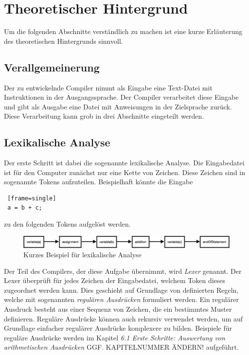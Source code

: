 
\section{Theoretischer Hintergrund}
Um die folgenden Abschnitte verständlich zu machen ist eine kurze Erläuterung des theoretischen Hintergrunds sinnvoll.
\subsection{Verallgemeinerung}
Der zu entwickelnde Compiler nimmt als Eingabe eine Text-Datei mit Instruktionen in der Ausgangssprache. Der Compiler verarbeitet diese Eingabe und gibt als Ausgabe eine Datei mit Anweisungen in der Zielsprache zurück. Diese Verarbeitung kann grob in drei Abschnitte eingeteilt werden.
\subsection{Lexikalische Analyse}
Der erste Schritt ist dabei die sogenannte lexikalische Analyse. Die Eingabedatei ist für den Computer zunächst nur eine Kette von Zeichen. Diese Zeichen sind in sogenannte Tokens aufzuteilen. Beispielhaft könnte die Eingabe
\begin{lstlisting} [frame=single]
 a = b + c;
\end{lstlisting}

zu den folgenden Tokens aufgelöst werden.

\begin{figure}[h!]
\centering
\includegraphics[scale=0.37]{pics/lex_beispiel.png}
\caption{Kurzes Beispiel für lexikalische Analyse}
\label{fig:method}
\end{figure}


Der Teil des Compilers, der diese Aufgabe übernimmt, wird \textit{Lexer} genannt. Der Lexer überprüft für jedes Zeichen der Eingabedatei, welchem Token dieses zugeordnet werden kann. Dies geschieht auf Grundlage von definierten Regeln, welche mit sogenannten \textit{regulären Ausdrücken} formuliert werden. Ein regulärer Ausdruck besteht aus einer Sequenz von Zeichen, die ein bestimmtes Muster definieren. Reguläre Ausdrücke können auch rekursiv verwendet werden, um auf Grundlage einfacher regulärer Ausdrücke komplexere zu bilden. Beispiele für reguläre Ausdrücke werden im Kapitel \textit{6.1 Erste Schritte: Auswertung von arithmetischen Ausdrücken} GGF. KAPITELNUMMER ÄNDERN! aufgeführt.

